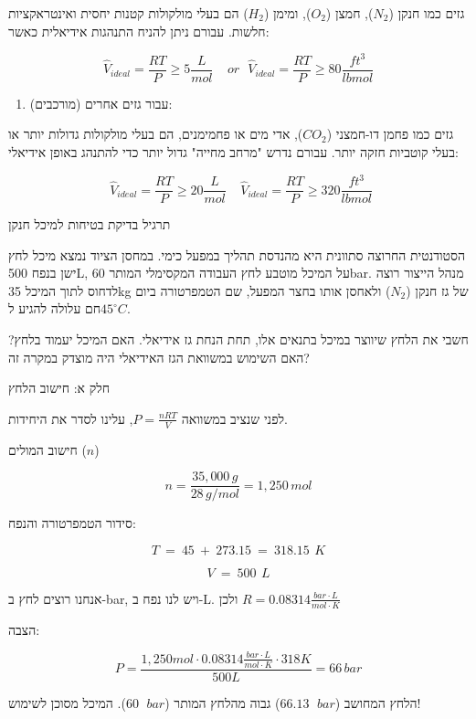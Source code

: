 \documentclass[
  hebrew,
  letterpaper,
  DIV=11,
  numbers=noendperiod]{scrreprt}
\providecommand{\tightlist}{%
  \setlength{\itemsep}{0pt}\setlength{\parskip}{0pt}}
\begin{document}
גזים כמו חנקן (\(N_{2}\)), חמצן (\(O_{2}\)), ומימן (\(H_{2}\)) הם בעלי
מולקולות קטנות יחסית ואינטראקציות חלשות. עבורם ניתן להניח התנהגות
אידיאלית כאשר:

\[{\widehat{V}}_{ideal} = \frac{RT}{P} \geq 5\frac{L}{mol}\ \ \ \ \ or\ \ \ {\widehat{V}}_{ideal} = \frac{RT}{P} \geq 80\frac{ft^{3}}{lbmol}\]

\begin{enumerate}
\def\labelenumi{\arabic{enumi}.}
\setcounter{enumi}{1}
\tightlist
\item
  עבור גזים אחרים (מורכבים):
\end{enumerate}

גזים כמו פחמן דו-חמצני (\(CO_{2}\)), אדי מים או פחמימנים, הם בעלי
מולקולות גדולות יותר או בעלי קוטביות חזקה יותר. עבורם נדרש "מרחב מחייה"
גדול יותר כדי להתנהג באופן אידיאלי:

\[\ \ {\widehat{V}}_{ideal} = \frac{RT}{P} \geq 20\frac{L}{mol}\ \ \ \ \ {\widehat{V}}_{ideal} = \frac{RT}{P} \geq 320\frac{ft^{3}}{lbmol}\]

תרגיל בדיקת בטיחות למיכל חנקן

הסטודנטית החרוצה סתוונית היא מהנדסת תהליך במפעל כימי. במחסן הציוד נמצא
מיכל לחץ ישן בנפח 500L, על המיכל מוטבע לחץ העבודה המקסימלי המותר 60bar.
מנהל הייצור רוצה לדחוס לתוך המיכל 35kg של גז חנקן (\(N_{2}\)) ולאחסן
אותו בחצר המפעל, שם הטמפרטורה ביום חם עלולה להגיע ל\(45^{\circ}C\).

חשבי את הלחץ שיווצר במיכל בתנאים אלו, תחת הנחת גז אידיאלי. האם המיכל
יעמוד בלחץ? האם השימוש במשוואת הגז האידיאלי היה מוצדק במקרה זה?

חלק א\textquotesingle: חישוב הלחץ

לפני שנציב במשוואה \(P = \frac{nRT}{V}\), עלינו לסדר את היחידות.

חישוב המולים (\(n\))

\[n = \frac{35,000\, g}{28\, g\text{/}mol} = 1,250\, mol\]

סידור הטמפרטורה והנפח:

\[T\  = \ 45\  + \ 273.15\  = \ 318.15\,\ K\]

\[V\  = \ 500\ \, L\]

אנחנו רוצים לחץ ב-bar, ויש לנו נפח ב-L. ולכן
\(R = 0.08314\frac{bar \cdot L}{mol \cdot K}\)

הצבה:

\[P = \frac{1,250mol \cdot 0.08314\frac{bar \cdot L}{mol \cdot K} \cdot 318K}{500L} = 66\, bar\]

הלחץ המחושב (\(66.13\ \,\ bar\)) גבוה מהלחץ המותר (\(60\ \,\ bar\)).
המיכל מסוכן לשימוש!
\end{document}
